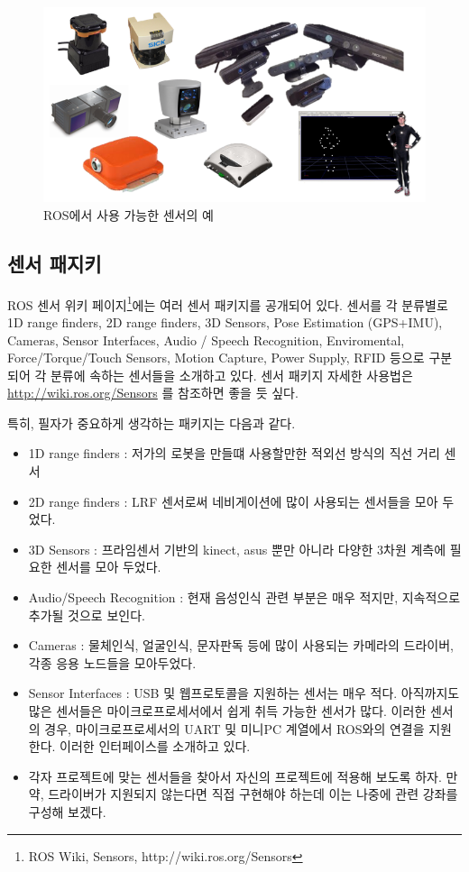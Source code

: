 \begin{figure}[h]
\centering\includegraphics[width=0.8\columnwidth]{pictures/chapter8/sensors.png}
\caption{ROS에서 사용 가능한 센서의 예}
\end{figure}

\subsection{센서 패지키}

ROS 센서 위키 페이지\footnote{ROS Wiki, Sensors, http://wiki.ros.org/Sensors}에는 여러 센서 패키지를 공개되어 있다. 센서를 각 분류별로 1D range finders, 2D range finders, 3D Sensors, Pose Estimation (GPS+IMU), Cameras, Sensor Interfaces, Audio / Speech Recognition, Enviromental, Force/Torque/Touch Sensors, Motion Capture, Power Supply, RFID 등으로 구분되어 각 분류에 속하는 센서들을 소개하고 있다. 센서 패키지 자세한 사용법은 \url{http://wiki.ros.org/Sensors} 를 참조하면 좋을 듯 싶다.

\noindent
특히, 필자가 중요하게 생각하는 패키지는 다음과 같다.

\begin{itemize}[leftmargin=*]
\item 1D range finders : 저가의 로봇을 만들떄 사용할만한 적외선 방식의 직선 거리 센서
\item 2D range finders : LRF 센서로써 네비게이션에 많이 사용되는 센서들을 모아 두었다.
\item 3D Sensors : 프라임센서 기반의 kinect, asus 뿐만 아니라 다양한 3차원 계측에 필요한 센서를 모아 두었다.
\item Audio/Speech Recognition : 현재 음성인식 관련 부분은 매우 적지만, 지속적으로 추가될 것으로 보인다.
\item Cameras : 물체인식, 얼굴인식, 문자판독 등에 많이 사용되는 카메라의 드라이버, 각종 응용 노드들을 모아두었다.
\item Sensor Interfaces : USB 및 웹프로토콜을 지원하는 센서는 매우 적다. 아직까지도 많은 센서들은 마이크로프로세서에서 쉽게 취득 가능한 센서가 많다. 이러한 센서의 경우, 마이크로프로세서의 UART 및 미니PC 계열에서 ROS와의 연결을 지원한다. 이러한 인터페이스를 소개하고 있다.
 \item 각자 프로젝트에 맞는 센서들을 찾아서 자신의 프로젝트에 적용해 보도록 하자. 만약, 드라이버가 지원되지 않는다면 직접 구현해야 하는데 이는 나중에 관련 강좌를 구성해 보겠다.
\end{itemize}

